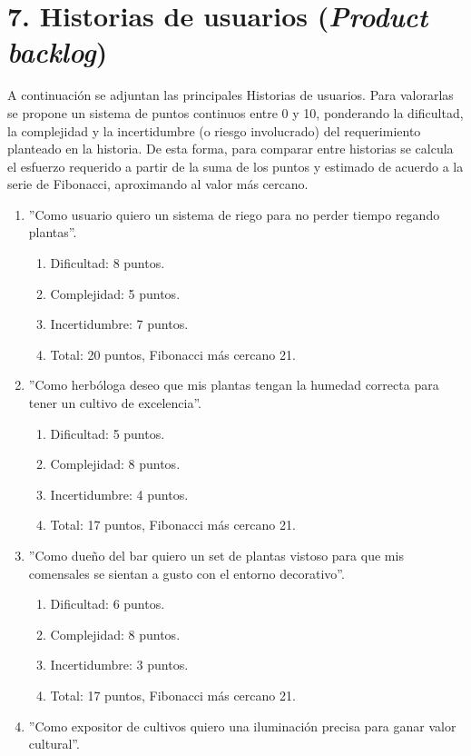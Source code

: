 \documentclass[
11pt, %
]{charter}
\begin{document}
\section{7. Historias de usuarios (\textit{Product backlog})}
\label{sec:backlog}

A continuación se adjuntan las principales Historias de usuarios. Para valorarlas se propone un sistema de puntos continuos entre 0 y 10, ponderando la dificultad, la complejidad y la incertidumbre (o riesgo involucrado) del requerimiento planteado en la historia. De esta forma, para comparar entre historias se calcula el esfuerzo requerido a partir de la suma de los puntos y estimado de acuerdo a la serie de Fibonacci, aproximando al valor más cercano.
\begin{enumerate}
	\item ''Como usuario quiero un sistema de riego para no perder tiempo regando plantas''.
	\begin{enumerate}
		\item Dificultad: 8 puntos.
		\item Complejidad: 5 puntos.
		\item Incertidumbre: 7 puntos.
		\item Total: 20 puntos, Fibonacci más cercano 21.
	\end{enumerate}
	\item ''Como herbóloga deseo que mis plantas tengan la humedad correcta para tener un cultivo de excelencia''.
	\begin{enumerate}
		\item Dificultad: 5 puntos.
		\item Complejidad: 8 puntos.
		\item Incertidumbre: 4 puntos.
		\item Total: 17 puntos, Fibonacci más cercano 21.
	\end{enumerate}
	\item ''Como dueño del bar quiero un set de plantas vistoso para que mis comensales se sientan a gusto con el entorno decorativo''.
	\begin{enumerate}
		\item Dificultad: 6 puntos.
		\item Complejidad: 8 puntos.
		\item Incertidumbre: 3 puntos.
		\item Total: 17 puntos, Fibonacci más cercano 21.
	\end{enumerate}
	\item ''Como expositor de cultivos quiero una iluminación precisa para ganar valor cultural''.

\end{enumerate}
\end{document}
